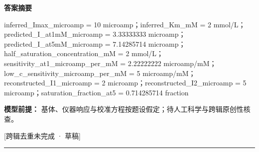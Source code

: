 \documentclass[UTF8,11pt,a4paper]{ctexart}
\begin{document}
\noindent\textbf{答案摘要}\par
inferred\_Imax\_microamp = 10 microamp；inferred\_Km\_mM = 2 mmol/L；predicted\_I\_at1mM\_microamp = 3.33333333 microamp；predicted\_I\_at5mM\_microamp = 7.14285714 microamp；half\_saturation\_concentration\_mM = 2 mmol/L；sensitivity\_at1\_microamp\_per\_mM = 2.22222222 microamp/mM；low\_c\_sensitivity\_microamp\_per\_mM = 5 microamp/mM；reconstructed\_I1\_microamp = 2 microamp；reconstructed\_I2\_microamp = 5 microamp；saturation\_fraction\_at5 = 0.714285714 fraction\par
\noindent\textbf{模型前提：}
基体、仪器响应与校准方程按题设假定；待人工科学与跨辑原创性核查。\par
\noindent\textcolor{red!65!black}{[跨辑去重未完成 · 草稿]} \par
\medskip\hrule\medskip
{}
\end{document}
